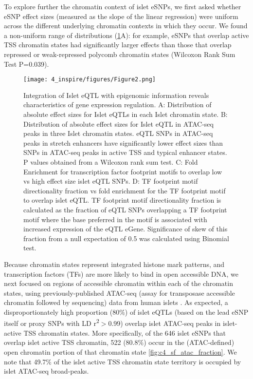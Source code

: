 To explore further the chromatin context of islet eSNPs, we first asked whether eSNP effect sizes (measured as the slope of the linear regression) were uniform across the different underlying chromatin contexts in which they occur. We found a non-uniform range of distributions (\ref{fig:c4_f2}A): for example, eSNPs that overlap active TSS chromatin states had significantly larger effects than those that overlap repressed or weak-repressed polycomb chromatin states (Wilcoxon Rank Sum Test P=0.039). 

\begin{figure}
    \centering
    \texttt{[image: 4\_inspire/figures/Figure2.png]}
    \caption[Integration of Islet eQTL with epigenomic information reveals characteristics of gene expression regulation]{Integration of Islet eQTL with epigenomic information reveals characteristics of gene expression regulation. A: Distribution of absolute effect sizes for Islet eQTLs in each Islet chromatin state. B: Distribution of absolute effect sizes for Islet eQTL in ATAC-seq peaks in three Islet chromatin states. eQTL SNPs in ATAC-seq peaks in stretch enhancers have significantly lower effect sizes than SNPs in ATAC-seq peaks in active TSS and typical enhancer states. P values obtained from a Wilcoxon rank sum test. C: Fold Enrichment for transcription factor footprint motifs to overlap low vs high effect size islet eQTL SNPs. D: TF footprint motif directionality fraction vs fold enrichment for the TF footprint motif to overlap islet eQTL. TF footprint motif directionality fraction is calculated as the fraction of eQTL SNPs overlapping a TF footprint motif where the base preferred in the motif is associated with increased expression of the eQTL eGene. Significance of skew of this fraction from a null expectation of 0.5 was calculated using Binomial test. }
    \label{fig:c4_f2}
\end{figure}
  
Because chromatin states represent integrated histone mark patterns, and transcription factors (TFs) are more likely to bind in open accessible DNA, we next focused on regions of accessible chromatin within each of the chromatin states, using previously-published ATAC-seq (assay for transposase accessible chromatin followed by sequencing) data from human islets \cite{varshneyGeneticRegulatorySignatures2017}. As expected, a disproportionately high proportion (80\%) of islet eQTLs (based on the lead eSNP itself or proxy SNPs with LD r\textsuperscript{2}$>$0.99) overlap islet ATAC-seq peaks in islet-active TSS chromatin states. More specifically, of the 646 islet eSNPs that overlap islet active TSS chromatin, 522 (80.8\%) occur in the (ATAC-defined) open chromatin portion of that chromatin state \ref{fig:c4_sf_atac_fraction}. We note that 49.7\% of the islet active TSS chromatin state territory is occupied by islet ATAC-seq broad-peaks.

